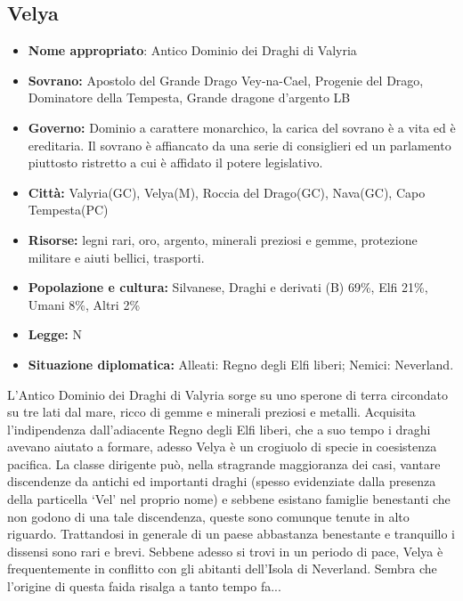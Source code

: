 \documentclass[10pt, a4paper]{report}
\begin{document}
\begin{multicols}{2}
\subsection*{Velya}
\begin{itemize}
	\item \textbf{Nome appropriato}: Antico Dominio dei Draghi di Valyria
	\item \textbf{Sovrano:} Apostolo del Grande Drago Vey-na-Cael, Progenie del Drago, Dominatore della Tempesta, Grande dragone d'argento LB 
	\item \textbf{Governo:} Dominio a carattere monarchico, la carica del sovrano è a vita ed è ereditaria. Il sovrano è affiancato da una serie di consiglieri ed un parlamento piuttosto ristretto a cui è affidato il potere legislativo.
	\item \textbf{Città:}  Valyria(GC), Velya(M), Roccia del Drago(GC), Nava(GC), Capo Tempesta(PC)
	\item \textbf{Risorse:} legni rari, oro, argento, minerali preziosi e gemme, protezione militare e aiuti bellici, trasporti.
	\item \textbf{Popolazione e cultura:} Silvanese, Draghi e derivati (B) 69\%, Elfi 21\%, Umani 8\%, Altri 2\%
	\item \textbf{Legge:} N
	\item \textbf{Situazione diplomatica:} Alleati: Regno degli Elfi liberi; Nemici: Neverland.
\end{itemize}
L'Antico Dominio dei Draghi di Valyria sorge su uno sperone di terra circondato su tre lati dal mare, ricco di gemme e minerali preziosi e metalli. Acquisita l'indipendenza dall'adiacente Regno degli Elfi liberi, che a suo tempo i draghi avevano aiutato a formare, adesso Velya è un crogiuolo di specie in coesistenza pacifica. La classe dirigente può, nella stragrande maggioranza dei casi, vantare discendenze da antichi ed importanti draghi (spesso evidenziate dalla presenza della particella \enquote*{Vel} nel proprio nome) e sebbene esistano famiglie benestanti che non godono di una tale discendenza, queste sono comunque tenute in alto riguardo. Trattandosi in generale di un paese abbastanza benestante e tranquillo i dissensi sono rari e brevi. Sebbene adesso si trovi in un periodo di pace, Velya è frequentemente in conflitto con gli abitanti dell'Isola di Neverland. Sembra che l'origine di questa faida risalga a tanto tempo fa...


\end{multicols}
\end{document}
